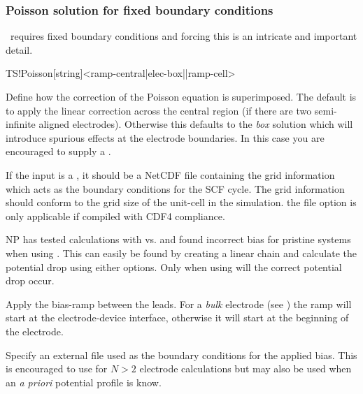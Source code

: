\subsubsection{Poisson solution for fixed boundary conditions}

\tsiesta\ requires fixed boundary conditions and forcing this is an
intricate and important detail. 

\begin{fdfentry}{TS!Poisson}[string]<ramp-central|elec-box||ramp-cell>

  Define how the correction of the Poisson equation is
  superimposed. The default is to apply the linear correction across
  the central region (if there are two semi-infinite aligned
  electrodes).  Otherwise this defaults to the \emph{box} solution
  which will introduce spurious effects at the electrode
  boundaries. In this case you are encouraged to supply a .

  If the input is a , it should be a NetCDF file containing
  the grid information which acts as the boundary conditions for the
  SCF cycle. 
  The grid information should conform to the grid size of the
  unit-cell in the simulation.
  \note the file option is only applicable if compiled with CDF4
  compliance.

  \begin{developer}
    
    NP has tested calculations with 
    vs.  and found incorrect bias for pristine
    systems when using . This can easily be found by
    creating a linear chain and calculate the potential drop using
    either options. Only when using  will the correct
    potential drop occur.
    
  \end{developer}

  \begin{fdfoptions}

    Apply the bias-ramp between the leads. For a \emph{bulk} electrode
    (see ) the ramp will start at the
    electrode-device interface, otherwise it will start at the
    beginning of the electrode.


    \option[<file>]%

    Specify an external file used as the boundary conditions for the
    applied bias. This is encouraged to use for $N>2$ electrode
    calculations but may also be used when an \emph{a priori}
    potential profile is know.


\end{fdfoptions}
\end{fdfentry}
